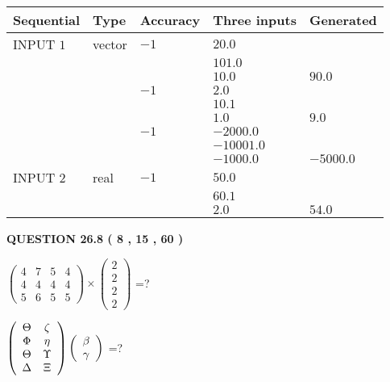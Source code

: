 \documentclass[12pt]{article}
\begin{document}
   
  
  
\noindent\begin{tabular}{|l|l|l|l|l|}
\hline
 Sequential & Type & Accuracy & Three inputs & Generated \\ 
\hline
 
 
  INPUT $            1 $ & vector & $           -1  $ & $
20.0
  $ & \\
  & & & $
101.0
  $ & \\
  & & & $
10.0
$ & $ 90.0 $ 
  \\
  & & $           -1  $ & $
2.0
  $ & \\
  & & & $
10.1
  $ & \\
  & & & $
1.0
$ & $ 9.0 $ 
  \\
  & & $           -1  $ & $
-2000.0
  $ & \\
  & & & $
-10001.0
  $ & \\
  & & & $
-1000.0
$ & $ -5000.0 $ 
 \\  \hline  
 
 
  INPUT $            2 $ & real & $           -1  $ & $
 50.0
  $ & \\
  & & &  $
 60.1
  $ & \\
  & & &  $
 2.0
 $ & $ 54.0 $ 
 \\  \hline  
 \end{tabular}
   
   
  
\vspace{0.2in}
  
{\textbf{\Large{QUESTION
26.8 
 (           8 ,          15 ,          60 )
}}}
  
  
 
$ \left( \begin{array}{ccccccccc}
           4  & 
           7  & 
           5  & 
           4  \\ 
           4  & 
           4  & 
           4  & 
           4  \\ 
           5  & 
           6  & 
           5  & 
           5
\end{array}\right) \times
\left( \begin{array}{c}
           2  \\ 
           2  \\ 
           2  \\ 
           2
\end{array}\right) $ =?
 
 
$  %
 \left( \begin{array}
 {
 c
 c
 }
 \Theta & 
                    \zeta \\ 
 \Phi & 
 \eta \\ 
 \Theta & 
 \Upsilon \\ 
 \Delta & 
                    \Xi
 \end{array} \right)
 \left( \begin{array}
 {
 c
 }
 \beta \\ 
 \gamma
 \end{array} \right)
$ =?
 
\end{document}
